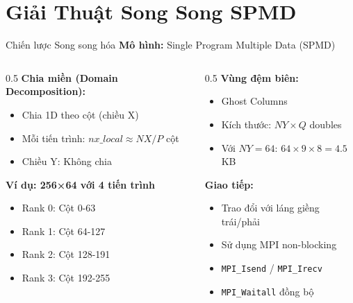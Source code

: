\documentclass[t, aspectratio=169]{beamer}
\begin{document}
	\section{Giải Thuật Song Song SPMD}
	
	\begin{frame}{Chiến lược Song song hóa}
		\textbf{Mô hình:} Single Program Multiple Data (SPMD)
		
		\vspace{1em}
		
		\begin{columns}[T]
			\begin{column}{0.5\textwidth}
				\textbf{Chia miền (Domain Decomposition):}
				\begin{itemize}
					\item Chia 1D theo cột (chiều X)
					\item Mỗi tiến trình: $nx\_local \approx NX/P$ cột
					\item Chiều Y: Không chia
				\end{itemize}
				
				\vspace{0.5em}
				
				\textbf{Ví dụ: 256×64 với 4 tiến trình}
				\begin{itemize}
					\item Rank 0: Cột 0-63
					\item Rank 1: Cột 64-127
					\item Rank 2: Cột 128-191
					\item Rank 3: Cột 192-255
				\end{itemize}
			\end{column}
			
			\begin{column}{0.5\textwidth}
				\textbf{Vùng đệm biên:}
				\begin{itemize}
					\item \alert{Ghost Columns}
					\item Kích thước: $NY \times Q$ doubles
					\item Với $NY=64$: $64 \times 9 \times 8 = 4.5$ KB
				\end{itemize}
				
				\vspace{0.5em}
				
				\textbf{Giao tiếp:}
				\begin{itemize}
					\item Trao đổi với láng giềng trái/phải
					\item Sử dụng MPI non-blocking
					\item \texttt{MPI\_Isend} / \texttt{MPI\_Irecv}
					\item \texttt{MPI\_Waitall} đồng bộ
				\end{itemize}
			\end{column}
		\end{columns}
	\end{frame}
	
\end{document}
